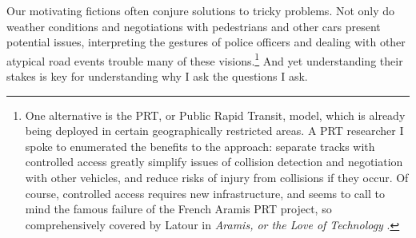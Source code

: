 


Our motivating fictions often conjure solutions to tricky problems.
Not only do weather conditions and negotiations with pedestrians and
other cars present potential issues, interpreting the gestures of
police officers and dealing with other atypical road events trouble
many of these visions.\footnote{One alternative is the PRT, or Public Rapid
Transit, model, which is already being deployed in certain
geographically restricted areas. A PRT researcher I spoke to
enumerated the benefits to the approach: separate tracks with
controlled access greatly simplify issues of collision detection and
negotiation with other vehicles, and reduce risks of injury from collisions if
they occur. Of course, controlled access requires new infrastructure,
and seems to call to mind the famous failure of the French Aramis PRT
project, so comprehensively covered by Latour in \emph{Aramis, or the
  Love of Technology} \cite{Aramis}.} And yet understanding their
stakes is key for understanding why I ask the questions I ask.

